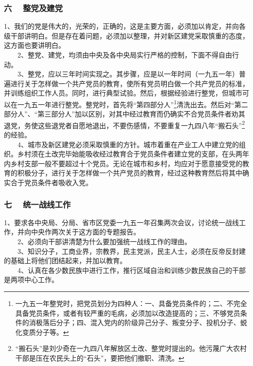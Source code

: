 \documentclass[cn,11pt,chinese]{elegantbook}
\def\myformat#1{\hfil\hfil #1}
\begin{document}
\subsubsection*{\myformat{六 　整党及建党}}
1、我们的党是伟大的，光荣的，正确的，这是主要方面，必须加以肯定，并向各级干部讲明白。但是存在着问题，必须加以整理，并对新区建党采取慎重的态度，这方面也要讲明白。\\
　　2、整党、建党，均须由中央及各中央局实行严格的控制，下面不得自由行动。\\
　　3、整党，应以三年时间实现之。其步骤，应是以一年时间（一九五一年）普遍进行关于怎样做一个共产党员的教育，使所有党员明白做一个共产党员的标准，并训练组织工作人员。同时，进行典型试验。然后，根据经验进行整党，但城市可以在一九五一年进行整党。整党时，首先将“第四部分人”\footnote[2]{一九五一年整党时，把党员划分为四种人：一、具备党员条件的；二、不完全具备党员条件，或者有较严重的毛病，必须加以改造提高的；三、不够党员条件的消极落后分子；四、混入党内的阶级异己分子、叛变分子、投机分子、蜕化变质分子等。}清洗出去。然后对“第二部分人”、“第三部分人”加以区别，对其中经过教育而仍确实不合党员条件者劝其退党，务使这些退党者自愿地退出，不要伤感情，不要重复一九四八年“搬石头”\footnote[3]{“搬石头”是刘少奇在一九四八年解放区土改、整党时提出的。他污蔑广大农村干部是压在农民头上的“石头”，要把他们撤职、清洗。}的经验。\\
　　4、城市及新区建党必须采取慎重的方针。城市着重在产业工人中建立党的组织。乡村须在土改完毕始能吸收经过教育合于党员条件者建立党的支部，在头两年内乡村支部一般不要超过十个党员。无论在城市和乡村，均应对于愿意接受党的教育的积极分子，进行关于怎样做一个共产党员的教育，经过这种教育然后将其中确实合于党员条件者吸收入党。\\
\subsubsection*{\myformat{七　 统一战线工作}}
1、要求各中央局、分局、省市区党委一九五一年召集两次会议，讨论统一战线工作，并向中央作两次关于这方面的专题报告。\\
　　2、必须向干部讲清楚为什么要加强统一战线工作的理由。\\
　　3、知识分子，工商业界，宗教界，民主党派，民主人士，必须在反帝反封建的基础上将他们团结起来，并加以教育。\\
　　4、认真在各少数民族中进行工作，推行区域自治和训练少数民族自己的干部是两项中心工作。\\
\end{document}
